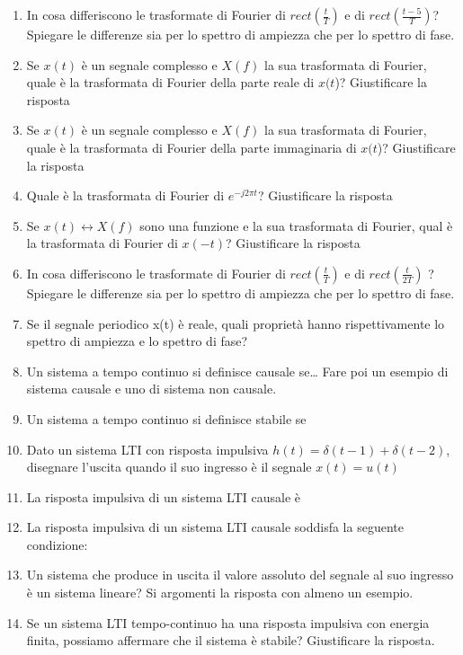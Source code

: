 \documentclass[12pt
]{article}
\begin{document}
\begin{enumerate}
\item
  In cosa differiscono le trasformate di Fourier di
  \(rect (\frac{t}{T})\) e di \(rect (\frac{t-5}{T})\)? Spiegare le
  differenze sia per lo spettro di ampiezza che per lo spettro di fase.


\item
  Se \(x(t)\) è un segnale complesso e \(X(f)\) la sua trasformata di
  Fourier, quale è la trasformata di Fourier della parte reale di
  \(x(t\))? Giustificare la risposta
  
  \item
  Se \(x(t)\) è un segnale complesso e \(X(f)\) la sua trasformata di
  Fourier, quale è la trasformata di Fourier della parte immaginaria di
  \(x(t\))? Giustificare la risposta
\item
  Quale è la trasformata di Fourier di $ e ^{-j2 \pi t}$?
  Giustificare la risposta
\item
  Se \(x(t) \leftrightarrow X(f)\) sono una funzione e la sua
  trasformata di Fourier, qual è la trasformata di Fourier di \(x(-t)\)?
  Giustificare la risposta



\item
  In cosa differiscono le trasformate di Fourier di $rect(\frac{t}{T})$ e
  di $rect(\frac{t}{2T})$ ? Spiegare le differenze sia per lo spettro di
  ampiezza che per lo spettro di fase.


\item
  Se il segnale periodico x(t) è reale, quali proprietà hanno
  rispettivamente lo spettro di ampiezza e lo spettro di fase?


\item
Un sistema a tempo continuo si definisce causale se\ldots{} Fare poi
un esempio di sistema causale e uno di sistema non causale.

\item
Un sistema a tempo continuo si definisce stabile se

\item
Dato un sistema LTI con risposta impulsiva $h(t) = \delta (t - 1) +\delta (t - 2)$,
disegnare l'uscita quando il suo ingresso è il segnale $x(t) = u(t)$  
\item 
La risposta impulsiva di un sistema LTI causale è
\item
La risposta impulsiva di un sistema LTI causale soddisfa la seguente
condizione:
\item
Un sistema che produce in uscita il valore assoluto del segnale al suo
ingresso è un sistema lineare? Si argomenti la risposta con almeno un
esempio.
\item
Se un sistema LTI tempo-continuo ha una risposta impulsiva con energia finita, possiamo affermare che il sistema è stabile? Giustificare la risposta.


\end{enumerate}
\end{document}
